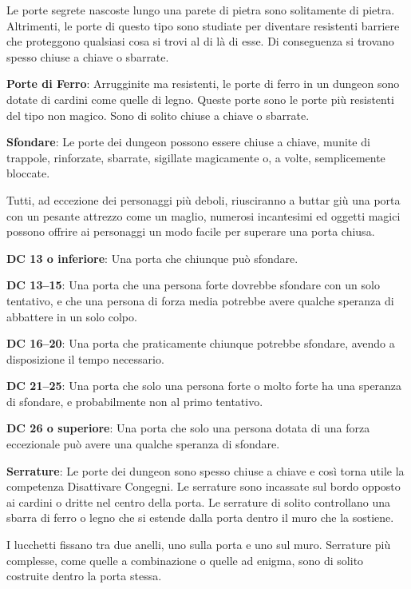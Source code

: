 \begin{multicols}{2}
Le porte segrete nascoste lungo una parete di pietra sono solitamente di pietra. Altrimenti, le porte di questo tipo sono studiate per diventare resistenti barriere che proteggono qualsiasi cosa si trovi al di là di esse. Di conseguenza si trovano spesso chiuse a chiave o sbarrate.

\textbf{Porte di Ferro}: Arrugginite ma resistenti, le porte di ferro in un dungeon sono dotate di cardini come quelle di legno. Queste porte sono le porte più resistenti del tipo non magico. Sono di solito chiuse a chiave o sbarrate.

\textbf{Sfondare}: Le porte dei dungeon possono essere chiuse a chiave, munite di trappole, rinforzate, sbarrate, sigillate magicamente o, a volte, semplicemente bloccate.

Tutti, ad eccezione dei personaggi più deboli, riusciranno a buttar giù una porta con un pesante attrezzo come un maglio, numerosi incantesimi ed oggetti magici possono offrire ai personaggi un modo facile per superare una porta chiusa.

\textbf{DC 13 o inferiore}: Una porta che chiunque può sfondare.

\textbf{DC 13--15}: Una porta che una persona forte dovrebbe sfondare con un solo tentativo, e che una persona di forza media potrebbe avere qualche speranza di abbattere in un solo colpo.

\textbf{DC 16--20}: Una porta che praticamente chiunque potrebbe sfondare, avendo a disposizione il tempo necessario.

\textbf{DC 21--25}: Una porta che solo una persona forte o molto forte ha una speranza di sfondare, e probabilmente non al primo tentativo.

\textbf{DC 26 o superiore}: Una porta che solo una persona dotata di una forza eccezionale può avere una qualche speranza di sfondare.

\textbf{Serrature}: Le porte dei dungeon sono spesso chiuse a chiave e così torna utile la competenza Disattivare Congegni. Le serrature sono incassate sul bordo opposto ai cardini o dritte nel centro della porta. Le serrature di solito controllano una sbarra di ferro o legno che si estende dalla porta dentro il muro che la sostiene.

I lucchetti fissano tra due anelli, uno sulla porta e uno sul muro. Serrature più complesse, come quelle a combinazione o quelle ad enigma, sono di solito costruite dentro la porta stessa.


\end{multicols}
